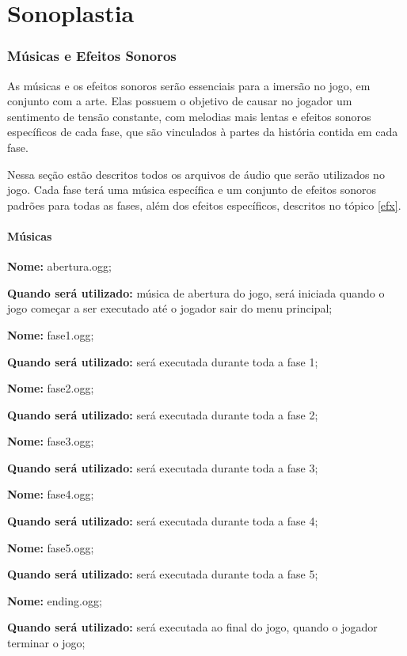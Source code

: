 \part*{Sonoplastia}

\section{Músicas e Efeitos Sonoros}

As músicas e os efeitos sonoros serão essenciais para a imersão no jogo, em conjunto com a arte. Elas possuem o objetivo de causar no jogador um sentimento de tensão constante, com melodias mais lentas e efeitos sonoros específicos de cada fase, que são vinculados à partes da história contida em cada fase. 

Nessa seção estão descritos todos os arquivos de áudio que serão utilizados no jogo. Cada fase terá uma música específica e um conjunto de efeitos sonoros padrões para todas as fases, além dos efeitos específicos, descritos no tópico \ref{efx}. 
\subsection{Músicas}
\begin{list}{}{}
\item\textbf{Nome:} abertura.ogg;

\textbf{Quando será utilizado:} música de abertura do jogo, será iniciada quando o jogo começar a ser executado até o jogador sair do menu principal; \\

\item\textbf{Nome:} fase1.ogg;

\textbf{Quando será utilizado:} será executada durante toda a fase 1; \\

\item\textbf{Nome:} fase2.ogg;

\textbf{Quando será utilizado:} será executada durante toda a fase 2; \\

\item\textbf{Nome:} fase3.ogg;

\textbf{Quando será utilizado:} será executada durante toda a fase 3; \\

\item\textbf{Nome:} fase4.ogg;

\textbf{Quando será utilizado:} será executada durante toda a fase 4; \\

\item\textbf{Nome:} fase5.ogg;

\textbf{Quando será utilizado:} será executada durante toda a fase 5; \\

\item\textbf{Nome:} ending.ogg;

\textbf{Quando será utilizado:} será executada ao final do jogo, quando o jogador terminar o jogo; \\


\end{list}
